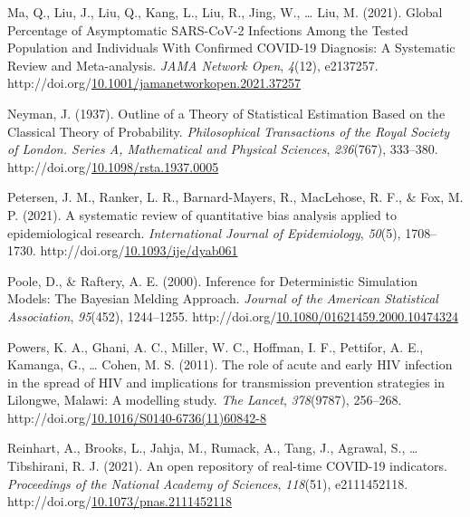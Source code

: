 \documentclass[12pt,twoside]{smiththesis}
\newlength{\cslhangindent}
\newenvironment{CSLReferences}[2] %
 {%
\setlength{\parindent}{0pt}
\ifodd #1 \everypar{\setlength{\hangindent}{\cslhangindent}}\ignorespaces\fi
\ifnum #2 > 0
\setlength{\parskip}{#2\baselineskip}
  \fi
}%
{}
\begin{document}
\begin{CSLReferences}{1}{0}
\leavevmode{}%
Ma, Q., Liu, J., Liu, Q., Kang, L., Liu, R., Jing, W., \ldots{} Liu, M. (2021). Global {Percentage} of {Asymptomatic SARS-CoV-2 Infections Among} the {Tested Population} and {Individuals With Confirmed COVID-19 Diagnosis}: {A Systematic Review} and {Meta-analysis}. \emph{JAMA Network Open}, \emph{4}(12), e2137257. http://doi.org/\href{https://doi.org/10.1001/jamanetworkopen.2021.37257}{10.1001/jamanetworkopen.2021.37257}

\leavevmode{}%
Neyman, J. (1937). Outline of a {Theory} of {Statistical Estimation Based} on the {Classical Theory} of {Probability}. \emph{Philosophical Transactions of the Royal Society of London. Series A, Mathematical and Physical Sciences}, \emph{236}(767), 333--380. http://doi.org/\href{https://doi.org/10.1098/rsta.1937.0005}{10.1098/rsta.1937.0005}

\leavevmode{}%
Petersen, J. M., Ranker, L. R., Barnard-Mayers, R., MacLehose, R. F., \& Fox, M. P. (2021). A systematic review of quantitative bias analysis applied to epidemiological research. \emph{International Journal of Epidemiology}, \emph{50}(5), 1708--1730. http://doi.org/\href{https://doi.org/10.1093/ije/dyab061}{10.1093/ije/dyab061}

\leavevmode{}%
Poole, D., \& Raftery, A. E. (2000). Inference for {Deterministic Simulation Models}: {The Bayesian Melding Approach}. \emph{Journal of the American Statistical Association}, \emph{95}(452), 1244--1255. http://doi.org/\href{https://doi.org/10.1080/01621459.2000.10474324}{10.1080/01621459.2000.10474324}

\leavevmode{}%
Powers, K. A., Ghani, A. C., Miller, W. C., Hoffman, I. F., Pettifor, A. E., Kamanga, G., \ldots{} Cohen, M. S. (2011). The role of acute and early {HIV} infection in the spread of {HIV} and implications for transmission prevention strategies in {Lilongwe}, {Malawi}: A modelling study. \emph{The Lancet}, \emph{378}(9787), 256--268. http://doi.org/\href{https://doi.org/10.1016/S0140-6736(11)60842-8}{10.1016/S0140-6736(11)60842-8}

\leavevmode{}%
Reinhart, A., Brooks, L., Jahja, M., Rumack, A., Tang, J., Agrawal, S., \ldots{} Tibshirani, R. J. (2021). An open repository of real-time {COVID-19} indicators. \emph{Proceedings of the National Academy of Sciences}, \emph{118}(51), e2111452118. http://doi.org/\href{https://doi.org/10.1073/pnas.2111452118}{10.1073/pnas.2111452118}


\end{CSLReferences}
\end{document}
